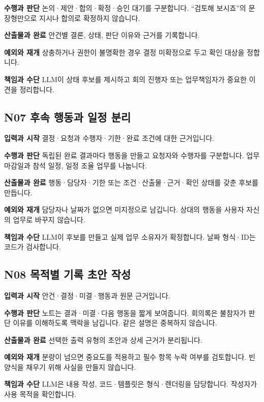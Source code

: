 \documentclass[a4paper,10pt]{article}
\begin{document}
\noindent\textbf{수행과 판단} 논의·제안·합의·확정·승인 대기를 구분합니다. “검토해 보시죠”의 문장형만으로 지시나 합의로 확정하지 않습니다.


\noindent\textbf{산출물과 완료} 안건별 결론, 상태, 판단 이유와 근거를 기록합니다.


\noindent\textbf{예외와 재개} 상충하거나 권한이 불명확한 경우 결정 미확정으로 두고 확인 대상을 정합니다.


\noindent\textbf{책임과 수단} LLM이 상태 후보를 제시하고 회의 진행자 또는 업무책임자가 중요한 이견을 정리합니다.


\endgroup
\begingroup\setlength{\parskip}{3pt}
\subsection*{N07 후속 행동과 일정 분리}
\noindent\textbf{입력과 시작} 결정·요청과 수행자·기한·완료 조건에 대한 근거입니다.


\noindent\textbf{수행과 판단} 독립된 완료 결과마다 행동을 만들고 요청자와 수행자를 구분합니다. 업무 마감일과 참석 일정, 일정 조율 업무를 나눕니다.


\noindent\textbf{산출물과 완료} 행동·담당자·기한 또는 조건·산출물·근거·확인 상태를 갖춘 후보를 만듭니다.


\noindent\textbf{예외와 재개} 담당자나 날짜가 없으면 미지정으로 남깁니다. 상대의 행동을 사용자 자신의 업무로 바꾸지 않습니다.


\noindent\textbf{책임과 수단} LLM이 후보를 만들고 실제 업무 소유자가 확정합니다. 날짜 형식·ID는 코드가 검사합니다.


\endgroup
\begingroup\setlength{\parskip}{3pt}
\subsection*{N08 목적별 기록 초안 작성}
\noindent\textbf{입력과 시작} 안건·결정·미결·행동과 원문 근거입니다.


\noindent\textbf{수행과 판단} 노트는 결과·미결·다음 행동을 짧게 보여줍니다. 회의록은 불참자가 판단 이유를 이해하도록 맥락을 남깁니다. 같은 설명은 중복하지 않습니다.


\noindent\textbf{산출물과 완료} 선택한 출력 유형의 초안과 상세 근거가 분리됩니다.


\noindent\textbf{예외와 재개} 분량이 넘으면 중요도를 적용하고 필수 항목 누락 여부를 검토합니다. 빈 양식을 채우기 위해 사실을 만들지 않습니다.


\noindent\textbf{책임과 수단} LLM은 내용 작성, 코드·템플릿은 형식·렌더링을 담당합니다. 작성자가 사용 목적을 확인합니다.
\end{document}
